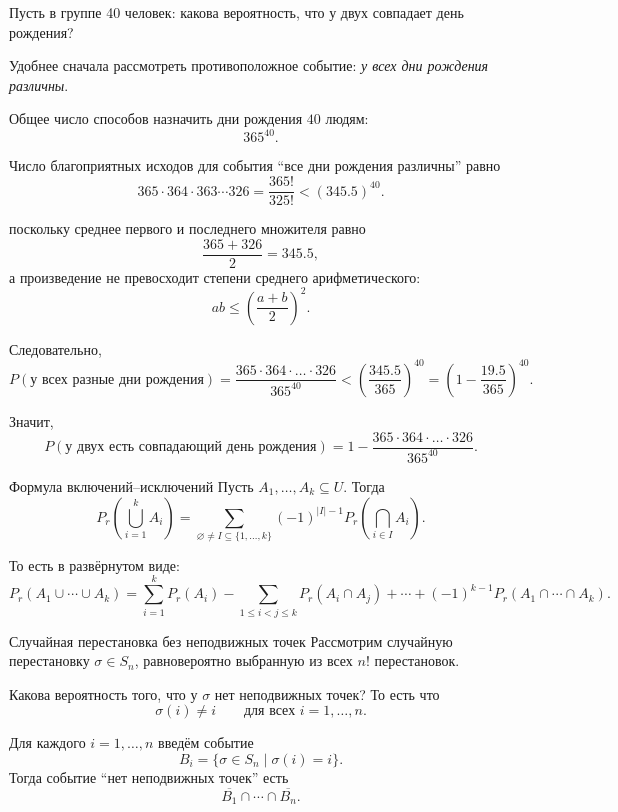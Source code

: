 \begin{Example}{}{}
	Пусть в группе 40 человек: какова вероятность, что у двух совпадает день рождения?
\end{Example}

Удобнее сначала рассмотреть противоположное событие: \textit{у всех дни рождения различны}.

Общее число способов назначить дни рождения \(40\) людям:
\[
365^{40}.
\]

Число благоприятных исходов для события ``все дни рождения различны'' равно
\[
365\cdot 364\cdot 363\cdots 326
=
\frac{365!}{325!} < (345.5)^{40}.
\]

поскольку среднее первого и последнего множителя равно
\[
\frac{365+326}{2}=345.5,
\]
а произведение не превосходит степени среднего арифметического:
\[
ab\le \left(\frac{a+b}{2}\right)^2.
\]

Следовательно,
\[
P(\text{у всех разные дни рождения})
=
\frac{365\cdot 364\cdot \ldots \cdot 326}{365^{40}} <
\left(\frac{345.5}{365}\right)^{40}
=
\left(1-\frac{19.5}{365}\right)^{40}.
\]

Значит,
\[
P(\text{у двух есть совпадающий день рождения})
=
1-\frac{365\cdot 364\cdot \ldots \cdot 326}{365^{40}}.
\]


\begin{Theorem}{Формула включений--исключений}{}
	Пусть \(A_1,\dots,A_k\subseteq U\). Тогда
	\[
	P_r\!\left(\bigcup_{i=1}^k A_i\right)
	=
	\sum_{\varnothing\neq I\subseteq \{1,\dots,k\}}
	(-1)^{|I|-1}
	P_r\!\left(\bigcap_{i\in I} A_i\right).
	\]
\end{Theorem}

То есть в развёрнутом виде:
\[
P_r(A_1\cup\cdots\cup A_k)
=
\sum_{i=1}^k P_r(A_i)
-
\sum_{1\le i<j\le k}P_r(A_i\cap A_j)
+\cdots
+(-1)^{k-1}P_r(A_1\cap\cdots\cap A_k).
\]

\begin{Example}{Случайная перестановка без неподвижных точек}{}
	Рассмотрим случайную перестановку \(\sigma\in S_n\), равновероятно выбранную из всех \(n!\) перестановок.
	
	Какова вероятность того, что у \(\sigma\) нет неподвижных точек?
	То есть что
	\[
	\sigma(i)\ne i
	\qquad \text{для всех } i=1,\dots,n.
	\]
\end{Example}

Для каждого \(i=1,\dots,n\) введём событие
\[
B_i=\{\sigma\in S_n \mid \sigma(i)=i\}.
\]
Тогда событие ``нет неподвижных точек'' есть
\[
\overline{B_1}\cap \cdots \cap \overline{B_n}.
\]

